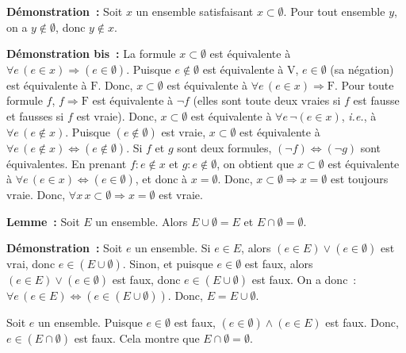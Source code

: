 \medskip

\noindent\textbf{Démonstration :} Soit $x$ un ensemble satisfaisant $x \subset \emptyset$.
    Pour tout ensemble $y$, on a $y \notin \emptyset$, donc $y \notin x$.
    
\done

\medskip

\noindent\textbf{Démonstration bis :} La formule $x \subset \emptyset$ est équivalente à $\forall e \, (e \in x) \Rightarrow (e \in \emptyset)$. 
    Puisque $e \notin \emptyset$ est équivalente à $\mathrm{V}$, $e \in \emptyset$ (sa négation) est équivalente à $\mathrm{F}$.
    Donc, $x \subset \emptyset$ est équivalente à $\forall e \, (e \in x) \Rightarrow \mathrm{F}$. 
    Pour toute formule $f$, $f \Rightarrow \mathrm{F}$ est équivalente à $\neg f$ (elles sont toute deux vraies si $f$ est fausse et fausses si $f$ est vraie).
    Donc, $x \subset \emptyset$ est équivalente à $\forall e \, \neg (e \in x)$, \textit{i.e.}, à $\forall e \, (e \notin x)$. 
    Puisque $(e \notin \emptyset)$ est vraie, $x \subset \emptyset$ est équivalente à $\forall e \, (e \notin x) \Leftrightarrow (e \notin \emptyset)$. 
    Si $f$ et $g$ sont deux formules, $(\neg f) \Leftrightarrow (\neg g)$ sont équivalentes. 
    En prenant $f: e \notin x$ et $g: e \notin \emptyset$, on obtient que $x \subset \emptyset$ est équivalente à $\forall e \, (e \in x) \Leftrightarrow (e \in \emptyset)$, et donc à $x = \emptyset$.
    Donc, $x \subset \emptyset \Rightarrow x = \emptyset$ est toujours vraie.
    Donc, $\forall x \, x \subset \emptyset \Rightarrow x = \emptyset$ est vraie.

    \done

\medskip

\noindent\textbf{Lemme :} Soit $E$ un ensemble. 
    Alors $E \cup \emptyset = E$ et $E \cap \emptyset = \emptyset$.

\medskip

\noindent\textbf{Démonstration :} 
    Soit $e$ un ensemble. 
    Si $e \in E$, alors $(e \in E) \vee (e \in \emptyset)$  est vrai, donc $e \in (E \cup \emptyset)$.
    Sinon, et puisque $e \in \emptyset$ est faux, alors $(e \in E) \vee (e \in \emptyset)$  est faux, donc $e \in (E \cup \emptyset)$ est faux.
    On a donc : $\forall e \, (e \in E) \Leftrightarrow (e \in (E \cup \emptyset))$.
    Donc, $E = E \cup \emptyset$.

    Soit $e$ un ensemble. 
    Puisque $e \in \emptyset$ est faux, $(e \in \emptyset) \wedge (e \in E)$ est faux. 
    Donc, $e \in (E \cap \emptyset)$ est faux.
    Cela montre que $E \cap \emptyset = \emptyset$.

